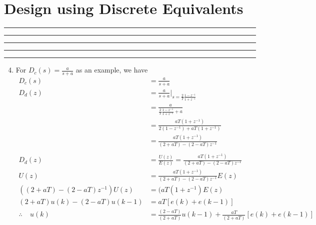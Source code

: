 \setcounter{chapter}{7}
\setcounter{section}{2}
\section{Design using Discrete Equivalents}
\vspace{-8pt} \hrule \hrule \hrule \hrule \hrule  \vspace{12pt}
\begin{enumerate}
	\setcounter{enumi}{3}
		\item For $D_c(s) = \frac{a}{s+a}$ as an example, we have 
		\begin{align*}
		    D_c(s) &= \frac{a}{s+a}\\
			D_d(z) &=  \frac{a}{s+a} |_{s =\frac{2}{T} \frac{1-z^{-1}}{1+z^{-1}} }\\
			       &= \frac{a}{\frac{2}{T} \frac{1-z^{-1}}{1+z^{-1}}+a} \\
			       &= \frac{aT(1+z^{-1})}{2(1-z^{-1}) + aT (1+z^{-1})} \\
			       &= \frac{aT(1+z^{-1})}{(2+aT) - (2-aT)z^{-1}} \\
			\\
			D_d(z) &= \frac{U(z)}{E(z)} = \frac{aT(1+z^{-1})}{(2+aT) - (2-aT)z^{-1}}\\
			U(z) &= \frac{aT(1+z^{-1})}{(2+aT) - (2-aT)z^{-1}} E(z)\\
			((2+aT) - (2-aT)z^{-1})U(z) &= (aT(1+z^{-1})E(z)\\
			(2+aT) u(k) - (2-aT) u(k-1) &= aT [ e(k) + e(k-1) ]  \\
			\therefore~~~~~
			u(k) &= \frac{(2-aT)}{(2+aT)} u(k-1) + \frac{aT}{(2+aT)} [ e(k) + e(k-1) ] 
		\end{align*}
\end{enumerate}